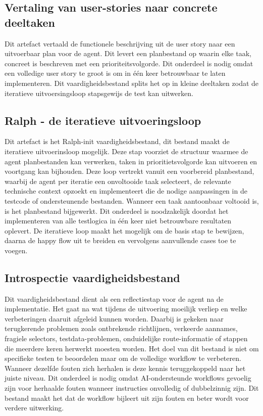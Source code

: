 \subsection{Vertaling van user-stories naar concrete deeltaken}
Dit artefact vertaald de functionele beschrijving uit de user story naar een uitvoerbaar plan voor de agent. Dit levert een planbestand op waarin elke taak, concreet is beschreven met een prioriteitsvolgorde.
Dit onderdeel is nodig omdat een volledige user story te groot is om in één keer betrouwbaar te laten implementeren. Dit vaardigheidsbestand splits het op in kleine deeltaken zodat de iteratieve uitvoersingsloop stapsgewijs de test kan uitwerken.

\subsection{Ralph  - de iteratieve uitvoeringsloop}
Dit artefact is het Ralph-init vaardigheidsbestand, dit bestand maakt de iteratieve uitvoerinsloop mogelijk. Deze stap voorziet de structuur waarmee de agent planbestanden kan verwerken, taken in prioritietsvolgorde kan uitvoeren en voortgang kan bijhouden. 
Deze loop vertrekt vanuit een voorbereid planbestand, waarbij de agent per iteratie een onvoltooide taak selecteert, de relevante technische context opzoekt en implementeert die de nodige aanpassingen in de testcode of ondersteunende bestanden. Wanneer een taak aantoonbaar voltooid is, is het planbestand bijgewerkt.
Dit onderdeel is noodzakelijk doordat het implementeren van alle testlogica in één keer niet betrouwbare resultaten oplevert. De iteratieve loop maakt het mogelijk om de basis stap te bewijzen, daarna de happy flow uit te breiden en vervolgens aanvullende cases toe te voegen.

\subsection{Introspectie vaardigheidsbestand}
Dit vaardigheidsbestand dient als een reflectiestap  voor de agent na de implementatie. Het gaat na wat tijdens de uitvoering moeilijk verliep en welke verbeteringen daaruit afgeleid kunnen worden.
Daarbij is gekeken naar terugkerende problemen zoals ontbrekende richtlijnen, verkeerde aannames, fragiele selectors, testdata-problemen, onduidelijke route-informatie of stappen die meerdere keren herwerkt moesten worden.
Het doel van dit bestand is niet om specifieke testen te beoordelen maar om de volledige workflow te verbeteren. Wanneer dezelfde fouten zich herhalen is deze kennis teruggekoppeld naar het juiste niveau.
Dit onderdeel is nodig omdat AI-ondersteunde workflows gevoelig zijn voor herhaalde fouten wanneer instructies onvolledig of dubbelzinnig zijn. Dit bestand maakt het dat de workflow bijleert uit zijn fouten en beter wordt voor verdere uitwerking.

